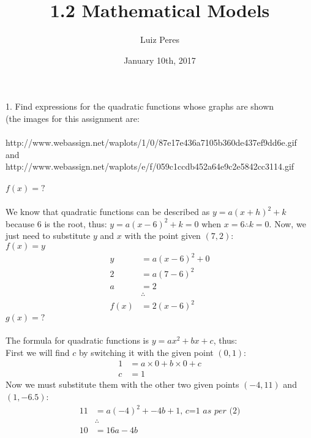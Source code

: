\documentclass{article}
\title{1.2 Mathematical Models}
\author{Luiz Peres}
\date{January 10th, 2017}
\begin{document}
\maketitle

1. Find expressions for the quadratic functions whose graphs are shown\\
(the images for this assignment are:\\\\
http://www.webassign.net/waplots/1/0/87e17e436a7105b360de437ef9dd6e.gif\\
and\\
http://www.webassign.net/waplots/e/f/059c1ccdb452a64e9c2e5842cc3114.gif
\\\\
$f(x) = ?$\\\\
We know that quadratic functions can be described as $y = a(x + h)^2 + k$ because 6 is the root, thus:
$y = a(x - 6)^2 + k = 0$ when $x = 6 \therefore k = 0$.
Now, we just need to substitute $y$ and $x$ with the point given $(7,2)$:\\
$f(x) = y$\\
\begin{equation}
\begin{split}
    y & = a(x - 6)^2 + 0\\
    2 & = a(7 - 6)^2\\
    a & = 2\\
    & \therefore\\
    f(x) & = 2(x - 6)^2
\end{split}
\end{equation}
$g(x) = ?$\\\\
The formula for quadratic functions is $y = ax^2 + bx + c$, thus:\\
First we will find $c$ by switching it with the given point $(0, 1)$:
\begin{equation}
\begin{split}
    1 & = a\times0 + b\times0 + c\\
    c & = 1 
\end{split}
\end{equation}
Now we must substitute them with the other two given points $(-4, 11)$ and $(1, -6.5)$:
\begin{equation}
\begin{split}
    11 & = a(-4)^2 + -4b + 1 \textit{, c=1 as per (2)}\\
    & \therefore\\
    10 & = 16a - 4b
\end{split}
\end{equation}
\end{document}
